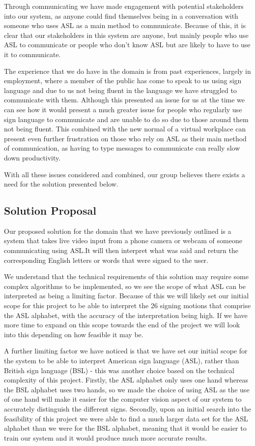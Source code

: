 \documentclass[10pt]{article}
\begin{document}
Through communicating we have made engagement with potential stakeholders into our system, as anyone 
could find themselves being in a conversation with someone who uses ASL as a main method to 
communicate. Because of this, it is clear that our stakeholders in this system are anyone, but 
mainly people who use ASL to communicate or people who don't know ASL but are likely to have to use 
it to communicate.

The experience that we do have in the domain is from past experiences, largely in employment, where 
a member of the public has come to speak to us using sign language and due to us not being fluent in 
the language we have struggled to communicate with them. Although this presented an issue for us at 
the time we can see how it would present a much greater issue for people who regularly use sign 
language to communicate and are unable to do so due to those around them not being fluent. This 
combined with the new normal of a virtual workplace can present even further frustration on those 
who rely on ASL as their main method of communication, as having to type messages to communicate can 
really slow down productivity.

With all these issues considered and combined, our group believes there exists a need for the 
solution presented below.

\subsection{Solution Proposal}

Our proposed solution for the domain that we have previously outlined is a system that takes live 
video input from a phone camera or webcam of someone communicating using ASL.It will then interpret 
what was said and return the corresponding English letters or words that were signed to the user.

We understand that the technical requirements of this solution may require some complex algorithms 
to be implemented, so we see the scope of what ASL can be interpreted as being a limiting factor. 
Because of this we will likely set our initial scope for this project to be able to interpret the
26 signing motions that comprise the ASL alphabet, with the accuracy of the interpretation being high.
If we have more time to expand on this scope towards the end of the project we will look into this 
depending on how feasible it may be.

A further limiting factor we have noticed is that we have set our initial scope for the system to be 
able to interpret American sign language (ASL), rather than British sign language (BSL) - this was 
another choice based on the technical complexity of this project. Firstly, the ASL alphabet only 
uses one hand whereas the BSL alphabet uses two hands, so we made the choice of using ASL as the use 
of one hand will make it easier for the computer vision aspect of our system to accurately 
distinguish the different signs. Secondly, upon an initial search into the feasibility of this 
project we were able to find a much larger data set for the ASL alphabet than we were for the BSL 
alphabet, meaning that it would be easier to train our system and it would produce much more 
accurate results. 
\end{document}
